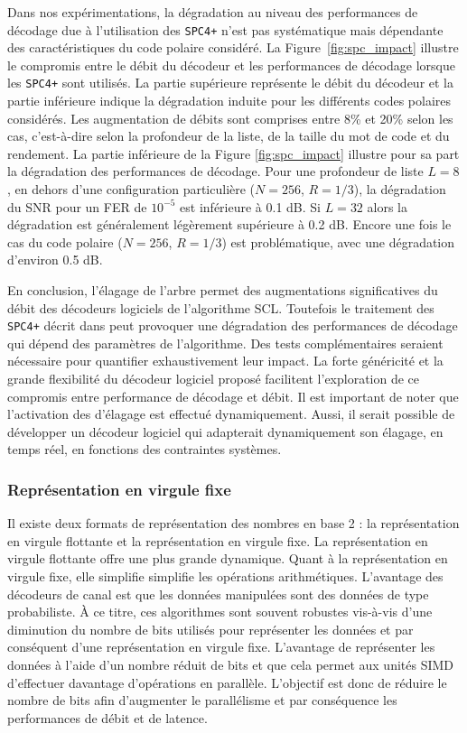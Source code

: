 Dans nos expérimentations, la dégradation au niveau des performances de décodage due à l'utilisation des \noeuds \texttt{SPC4+} n'est pas systématique mais dépendante des caractéristiques du code polaire considéré. La Figure~\ref{fig:spc_impact} illustre le compromis entre le débit du décodeur et les performances de décodage lorsque les \noeuds \texttt{SPC4+} sont utilisés. La partie supérieure représente le débit du décodeur et la partie inférieure indique la dégradation induite pour les différents codes polaires considérés. Les augmentation de débits sont comprises entre 8\% et 20\% selon les cas, c'est-à-dire selon la profondeur de la liste, de la taille du mot de code et du rendement. La partie inférieure de la Figure \ref{fig:spc_impact} illustre pour sa part la dégradation des performances de décodage. Pour une profondeur de liste $L=8$, en dehors d'une configuration particulière ($N=256$, $R=1/3$), la dégradation du SNR pour un FER de $10^{-5}$ est inférieure à 0.1 dB. Si $L=32$ alors la dégradation est généralement légèrement supérieure à 0.2 dB. Encore une fois le cas du code polaire ($N=256$, $R=1/3$) est problématique, avec une dégradation d'environ 0.5 dB.

En conclusion, l'élagage de l'arbre permet des augmentations significatives du débit des décodeurs logiciels de l'algorithme SCL. Toutefois le traitement des \noeuds \texttt{SPC4+} décrit dans \cite{sarkis_fast_2016} peut provoquer une dégradation des performances de décodage qui dépend des paramètres de l'algorithme. Des tests complémentaires seraient nécessaire pour quantifier exhaustivement leur impact. La forte généricité et la grande flexibilité du décodeur logiciel proposé facilitent l'exploration de ce compromis entre performance de décodage et débit. Il est important de noter que l'activation des \noeuds d'élagage est effectué dynamiquement. Aussi, il serait possible de développer un décodeur logiciel qui adapterait dynamiquement son élagage, en temps réel, en fonctions des contraintes systèmes.

\subsubsection{Représentation en virgule fixe}

Il existe deux formats de représentation des nombres en base 2 : la représentation en virgule flottante et la représentation en virgule fixe. La représentation en virgule flottante offre une plus grande dynamique. Quant à la représentation en virgule fixe, elle simplifie simplifie les opérations arithmétiques. L'avantage des décodeurs de canal est que les données manipulées sont des données de type probabiliste. \`A ce titre, ces algorithmes sont souvent robustes vis-à-vis d'une diminution du nombre de bits utilisés pour représenter les données et par conséquent d'une représentation en virgule fixe.
L'avantage de représenter les données à l'aide d'un nombre réduit de bits et que cela permet aux unités SIMD d'effectuer davantage d'opérations en parallèle. 
L'objectif est donc de réduire le nombre de bits afin d'augmenter le parallélisme et par conséquence les performances de débit et de latence.

